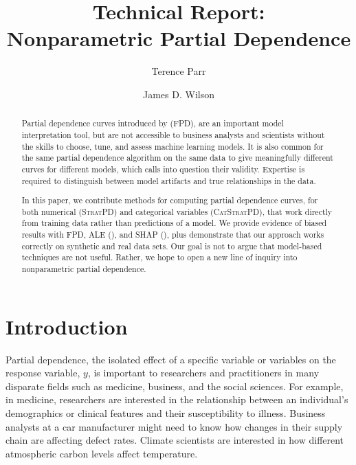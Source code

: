 \documentclass[smallextended]{svjour3}       %
\newcommand{\spd}{\fontfamily{cmr}\textsc{\small StratPD}}
\newcommand{\cspd}{\fontfamily{cmr}\textsc{\small CatStratPD}}
\begin{document}
\title{Technical Report:\\
Nonparametric Partial Dependence}

\author{Terence Parr \and James D. Wilson}



\maketitle

\begin{abstract}
Partial dependence curves introduced by \cite{PDP} (FPD), are an important model interpretation tool, but are not accessible to business analysts and scientists without the skills to choose, tune, and assess machine learning models.  It is also common for the same partial dependence algorithm on the same data to give meaningfully different curves for different models, which calls into question their validity.  Expertise is required to distinguish between model artifacts and true relationships in the data.

In this paper, we contribute methods for computing partial dependence curves, for both numerical (\spd) and categorical variables (\cspd), that work directly from training data rather than predictions of a model. We provide evidence of biased results with FPD, ALE (\cite{ALE}), and SHAP (\cite{shap}), plus demonstrate that our approach works correctly on synthetic and real data sets.  Our goal is not to argue that model-based techniques are not useful. Rather, we hope to open a new line of inquiry into nonparametric partial dependence.
\end{abstract}

\section{Introduction}

Partial dependence, the isolated effect of a specific variable or variables on the response variable, $y$, is important to researchers and practitioners in many disparate fields such as medicine, business, and the social sciences. For example, in medicine, researchers are interested in the relationship between an individual's demographics or clinical features and their susceptibility to illness. Business analysts at a car manufacturer might need to know how changes in their supply chain are affecting defect rates. Climate scientists are interested in how different atmospheric carbon levels affect temperature.
\end{document}
